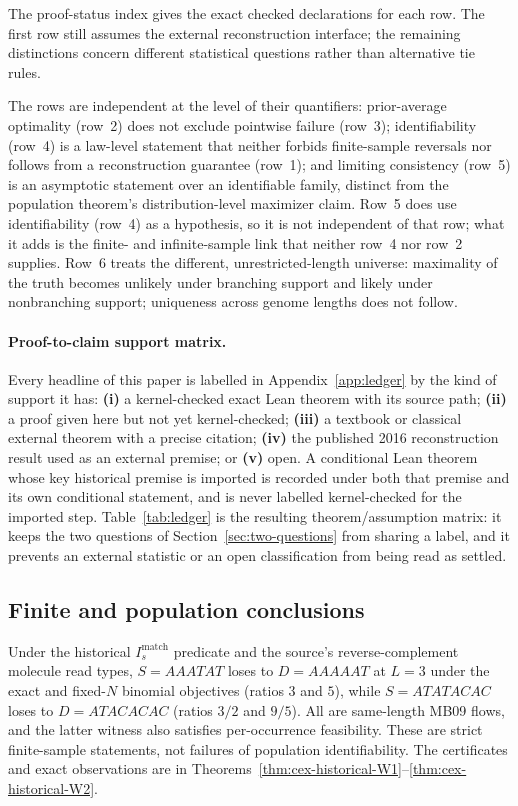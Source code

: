 \noindent
The proof-status index  gives the exact
checked declarations for each row. The first row still assumes the
external reconstruction interface; the remaining distinctions concern
different statistical questions rather than alternative tie rules.

The rows are independent at the level of their quantifiers: prior-average
optimality (row~2) does not exclude pointwise failure (row~3); identifiability
(row~4) is a law-level statement that neither forbids finite-sample reversals
nor follows from a reconstruction guarantee (row~1); and limiting consistency
(row~5) is an asymptotic statement over an identifiable family, distinct from
the population theorem's distribution-level maximizer claim. Row~5 does use
identifiability (row~4) as a hypothesis, so it is not independent of that row;
what it adds is the finite- and infinite-sample link that neither row~4 nor
row~2 supplies. Row~6 treats the different, unrestricted-length
universe: maximality of the truth becomes unlikely under branching
support and likely under nonbranching support; uniqueness across
genome lengths does not follow.

\paragraph{Proof-to-claim support matrix.}
Every headline of this paper is labelled in Appendix~\ref{app:ledger} by the
kind of support it has: \textbf{(i)} a kernel-checked exact Lean theorem with
its source path; \textbf{(ii)} a proof given here but not yet kernel-checked;
\textbf{(iii)} a textbook or classical external theorem with a precise
citation; \textbf{(iv)} the published 2016 reconstruction result used as an
external premise; or \textbf{(v)} open. A conditional Lean theorem whose key
historical premise is imported is recorded under both that premise and its own
conditional statement, and is never labelled kernel-checked for the imported
step. Table~\ref{tab:ledger} is the resulting theorem/assumption matrix: it
keeps the two questions of Section~\ref{sec:two-questions} from sharing a
label, and it prevents an external statistic or an open classification from
being read as settled.

\subsection{Finite and population conclusions}

\begin{counterexample}
\label{ex:W1W2}
Under the historical $I_s^{\mathrm{match}}$ predicate and the source's
reverse-complement molecule read types, $S=AAATAT$ loses to $D=AAAAAT$
at $L=3$ under the exact and fixed-$N$ binomial objectives (ratios $3$
and $5$), while $S=ATATACAC$ loses to $D=ATACACAC$
(ratios $3/2$ and $9/5$). All are same-length MB09 flows, and
the latter witness also satisfies per-occurrence feasibility. These are
strict finite-sample statements, not failures of population identifiability.
The certificates and exact observations are in
Theorems~\ref{thm:cex-historical-W1}--\ref{thm:cex-historical-W2}.
\end{counterexample}

